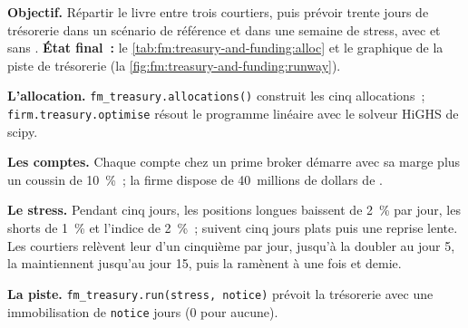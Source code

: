 \begin{tutorial}
\textbf{Objectif.} Répartir le livre entre trois courtiers, puis prévoir trente jours de trésorerie dans un scénario de référence et dans une semaine de stress, avec et sans
. \textbf{État final~:} le \cref{tab:fm:treasury-and-funding:alloc} et le graphique de la piste de trésorerie (la \cref{fig:fm:treasury-and-funding:runway}).
\begin{tutsteps}
\item \textbf{L'allocation.} \texttt{fm\_treasury.allocations()} construit les cinq allocations~; \texttt{firm.treasury.optimise} résout le
programme linéaire avec le solveur HiGHS de scipy.
\item \textbf{Les comptes.} Chaque compte chez un prime broker démarre avec sa marge plus un coussin de 10~\%~; la firme dispose de 40~millions de dollars de .
\item \textbf{Le stress.} Pendant cinq jours, les positions longues baissent de 2~\% par jour, les shorts de 1~\% et l'indice de 2~\%~; suivent cinq jours plats puis une reprise lente. Les
courtiers relèvent leur  d'un cinquième par jour, jusqu'à la doubler au jour 5, la maintiennent jusqu'au jour 15, puis la ramènent à une fois et demie.
\item \textbf{La piste.} \texttt{fm\_treasury.run(stress, notice)} prévoit la trésorerie avec une immobilisation de \texttt{notice} jours (0 pour aucune).
\end{tutsteps}
\end{tutorial}

